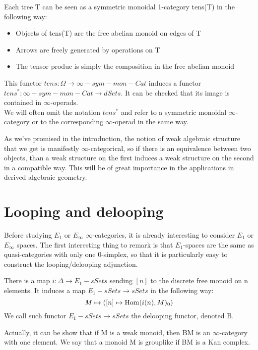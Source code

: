 \begin{refsection}
\begin{proposition}
Each tree T can be seen as a symmetric monoidal 1-category tens(T) in the following way:
\begin{itemize}
 \item Objects of tens(T) are the free abelian monoid on edges of T
\item Arrows are freely generated by operations on T
\item The tensor produc is simply the composition in the free abelian monoid
\end{itemize}
This functor $tens: \Omega\to \infty-sym-mon-Cat$ induces a functor $tens^*:\infty-sym-mon-Cat\to dSets$.
It can be checked that its image is contained in $\infty$-operads.\\
We will often omit the notation $tens^*$ and refer to a symmetric monoidal $\infty$-category or to the corresponding $\infty$-operad in the same way.
\end{proposition}

\begin{remark}
As we've promised in the introduction, the notion of weak algebraic structure that we get is manifestly $\infty$-categorical, so if there is an equivalence between
two objects, than a weak structure on the first induces a weak structure on the second in a compatible way. This will be of great importance in the applications in derived
algebraic geometry.
\end{remark}

\section{Looping and delooping}

Before studying $E_1$ or $E_{\infty}$ $\infty$-categories, it is already interesting to consider $E_1$ or $E_{\infty}$ spaces. The first interesting thing to remark is that
$E_1$-spaces are the same as quasi-categories with only one 0-simplex, so that it is particularly easy to construct the looping/delooping adjunction.

\begin{definition}
There is a map $i:\Delta\to E_1-sSets$ sending $[n]$ to the discrete free monoid on n elements. It induces a map $E_1-sSets\to sSets$ in the following way:
$$M\mapsto ([n]\mapsto \mathrm{Hom}(i(n),M)_0 )$$
We call such functor $E_1-sSets\to sSets$ the delooping functor, denoted B.
\end{definition}

\begin{proposition}
Actually, it can be show that if M is a weak monoid, then BM is an $\infty$-category with one element. We say that a monoid M is grouplike if BM is a Kan complex.
\end{proposition}


\end{refsection}

